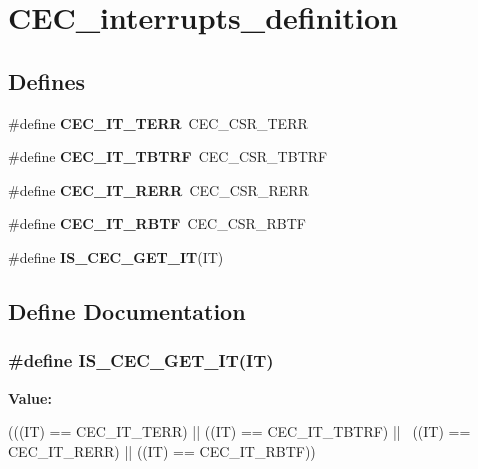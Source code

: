 \hypertarget{group__CEC__interrupts__definition}{
\section{CEC\_\-interrupts\_\-definition}
\label{group__CEC__interrupts__definition}
}
\subsection*{Defines}
\begin{DoxyCompactItemize}
\item 
\hypertarget{group__CEC__interrupts__definition_ga25f97d245f29e04a2d2bbc840389e6b5}{
\#define {\bfseries CEC\_\-IT\_\-TERR}~CEC\_\-CSR\_\-TERR}
\label{group__CEC__interrupts__definition_ga25f97d245f29e04a2d2bbc840389e6b5}

\item 
\hypertarget{group__CEC__interrupts__definition_ga12b00fb3989f9ce9f2f7fc0094c0747d}{
\#define {\bfseries CEC\_\-IT\_\-TBTRF}~CEC\_\-CSR\_\-TBTRF}
\label{group__CEC__interrupts__definition_ga12b00fb3989f9ce9f2f7fc0094c0747d}

\item 
\hypertarget{group__CEC__interrupts__definition_gac015ebba728a69eeb84be1bc56a58ac0}{
\#define {\bfseries CEC\_\-IT\_\-RERR}~CEC\_\-CSR\_\-RERR}
\label{group__CEC__interrupts__definition_gac015ebba728a69eeb84be1bc56a58ac0}

\item 
\hypertarget{group__CEC__interrupts__definition_ga42834131bf077a878e84470ae98f1bb4}{
\#define {\bfseries CEC\_\-IT\_\-RBTF}~CEC\_\-CSR\_\-RBTF}
\label{group__CEC__interrupts__definition_ga42834131bf077a878e84470ae98f1bb4}

\item 
\#define {\bfseries IS\_\-CEC\_\-GET\_\-IT}(IT)
\end{DoxyCompactItemize}


\subsection{Define Documentation}
\hypertarget{group__CEC__interrupts__definition_ga7f553a4a3346c676101d81a024a9cba8}{
\subsubsection[{IS\_\-CEC\_\-GET\_\-IT}]{\setlength{\rightskip}{0pt plus 5cm}\#define IS\_\-CEC\_\-GET\_\-IT(IT)}}
\label{group__CEC__interrupts__definition_ga7f553a4a3346c676101d81a024a9cba8}
{\bfseries Value:}
\begin{DoxyCode}
(((IT) == CEC_IT_TERR) || ((IT) == CEC_IT_TBTRF) || \
                           ((IT) == CEC_IT_RERR) || ((IT) == CEC_IT_RBTF))
\end{DoxyCode}
